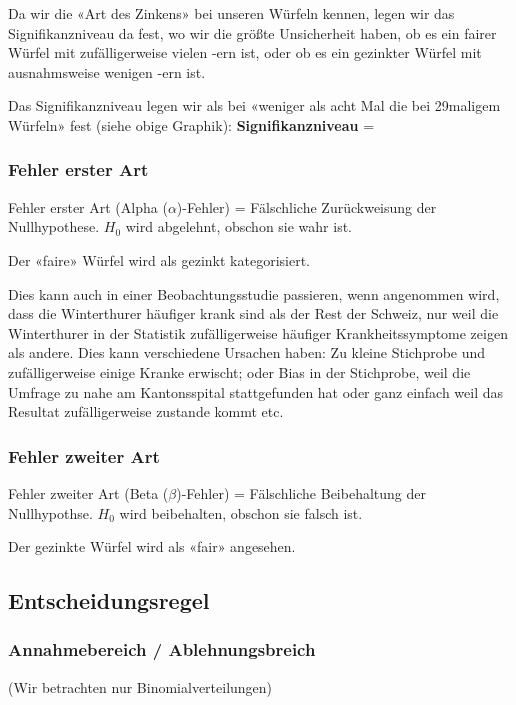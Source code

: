 Da wir die «Art des Zinkens» bei unseren Würfeln kennen, legen wir das
Signifikanzniveau da fest, wo wir die größte Unsicherheit haben, ob
es ein fairer Würfel mit zufälligerweise vielen -ern ist,
oder ob es ein gezinkter Würfel mit ausnahmsweise wenigen
-ern ist.

Das Signifikanzniveau legen wir als bei «weniger als acht Mal die
 bei 29maligem Würfeln» fest (siehe obige Graphik):
\vspace{15mm}
\textbf{Signifikanzniveau} = 


\subsubsection{Fehler erster Art}
Fehler erster Art (Alpha ($\alpha$)-Fehler) = Fälschliche
Zurückweisung der Nullhypothese. $H_0$ wird abgelehnt, obschon sie
wahr ist. 

Der «faire» Würfel wird als gezinkt kategorisiert.

Dies kann auch in einer Beobachtungsstudie passieren, wenn \zB
angenommen wird, dass die Winterthurer häufiger krank sind als der
Rest der Schweiz, nur weil die Winterthurer in der Statistik
zufälligerweise häufiger Krankheitssymptome zeigen als andere. Dies
kann verschiedene Ursachen haben: Zu kleine Stichprobe und
zufälligerweise einige Kranke erwischt; oder Bias in der Stichprobe,
weil die Umfrage zu nahe am Kantonsspital stattgefunden hat oder ganz
einfach weil das Resultat zufälligerweise zustande kommt etc.

\subsubsection{Fehler zweiter Art}
Fehler zweiter Art (Beta ($\beta$)-Fehler) = Fälschliche Beibehaltung
der Nullhypothse. $H_0$ wird beibehalten, obschon sie falsch ist. 

Der gezinkte Würfel wird als «fair» angesehen.

\TNTeop{}
\newpage


\subsection{Entscheidungsregel}
\subsubsection*{Annahmebereich / Ablehnungsbreich}
(Wir betrachten nur Binomialverteilungen)

